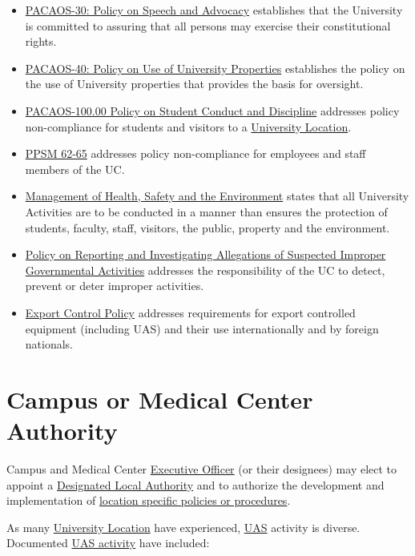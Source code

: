\documentclass[
]{book}
\begin{document}
\begin{itemize}
\item
  \href{http://policy.ucop.edu/doc/2710523}{PACAOS-30: Policy on Speech and Advocacy} establishes that the University is committed to assuring that all persons may exercise their constitutional rights.
\item
  \href{http://policy.ucop.edu/doc/2710524}{PACAOS-40: Policy on Use of University Properties} establishes the policy on the use of University properties that provides the basis for oversight.
\item
  \href{https://policy.ucop.edu/doc/2710530/PACAOS-100}{PACAOS-100.00 Policy on Student Conduct and Discipline} addresses policy non-compliance for students and visitors to a \protect\hyperlink{UL}{University Location}.
\item
  \href{https://policy.ucop.edu/manuals/personnel-policies-for-staff-members.html}{PPSM 62-65} addresses policy non-compliance for employees and staff members of the UC.
\item
  \href{http://policy.ucop.edu/doc/3500506}{Management of Health, Safety and the Environment} states that all University Activities are to be conducted in a manner than ensures the protection of students, faculty, staff, visitors, the public, property and the environment.
\item
  \href{https://policy.ucop.edu/doc/1100171/Whistleblower}{Policy on Reporting and Investigating Allegations of Suspected Improper Governmental Activities} addresses the responsibility of the UC to detect, prevent or deter improper activities.
\item
  \href{https://policy.ucop.edu/doc/2000676/ECP}{Export Control Policy} addresses requirements for export controlled equipment (including UAS) and their use internationally and by foreign nationals.
\end{itemize}

\hypertarget{ch-campus-auth}{%
\chapter{Campus or Medical Center Authority}\label{ch-campus-auth}}

Campus and Medical Center \protect\hyperlink{EO}{Executive Officer} (or their designees) may elect to appoint a \protect\hyperlink{DLA}{Designated Local Authority} and to authorize the development and implementation of \protect\hyperlink{LSP}{location specific policies or procedures}.

As many \protect\hyperlink{UL}{University Location} have experienced, \protect\hyperlink{UAS}{UAS} activity is diverse. Documented \protect\hyperlink{UASactivity}{UAS activity} have included:
\end{document}
